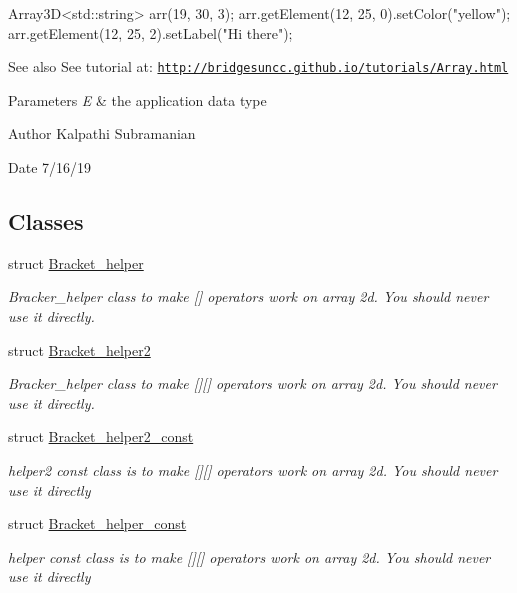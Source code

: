 \begin{DoxyCode}
Array3D<std::string> arr(19, 30, 3);
arr.getElement(12, 25, 0).setColor(\textcolor{stringliteral}{"yellow"});
arr.getElement(12, 25, 2).setLabel(\textcolor{stringliteral}{"Hi there"});
\end{DoxyCode}


\begin{DoxySeeAlso}{See also}
See tutorial at\+: \href{http://bridgesuncc.github.io/tutorials/Array.html}{\tt http\+://bridgesuncc.\+github.\+io/tutorials/\+Array.\+html}
\end{DoxySeeAlso}

\begin{DoxyParams}{Parameters}
{\em E} & the application data type\\
\hline
\end{DoxyParams}
\begin{DoxyAuthor}{Author}
Kalpathi Subramanian 
\end{DoxyAuthor}
\begin{DoxyDate}{Date}
7/16/19 
\end{DoxyDate}
\subsection*{Classes}
\begin{DoxyCompactItemize}
\item 
struct \hyperlink{structbridges_1_1datastructure_1_1_array3_d_1_1_bracket__helper}{Bracket\+\_\+helper}
\begin{DoxyCompactList}\small\item\em Bracker\+\_\+helper class to make \mbox{[}\mbox{]} operators work on array 2d. You should never use it directly. \end{DoxyCompactList}\item 
struct \hyperlink{structbridges_1_1datastructure_1_1_array3_d_1_1_bracket__helper2}{Bracket\+\_\+helper2}
\begin{DoxyCompactList}\small\item\em Bracker\+\_\+helper class to make \mbox{[}\mbox{]}\mbox{[}\mbox{]} operators work on array 2d. You should never use it directly. \end{DoxyCompactList}\item 
struct \hyperlink{structbridges_1_1datastructure_1_1_array3_d_1_1_bracket__helper2__const}{Bracket\+\_\+helper2\+\_\+const}
\begin{DoxyCompactList}\small\item\em helper2 const class is to make \mbox{[}\mbox{]}\mbox{[}\mbox{]} operators work on array 2d. You should never use it directly \end{DoxyCompactList}\item 
struct \hyperlink{structbridges_1_1datastructure_1_1_array3_d_1_1_bracket__helper__const}{Bracket\+\_\+helper\+\_\+const}
\begin{DoxyCompactList}\small\item\em helper const class is to make \mbox{[}\mbox{]}\mbox{[}\mbox{]} operators work on array 2d. You should never use it directly \end{DoxyCompactList}\end{DoxyCompactItemize}
